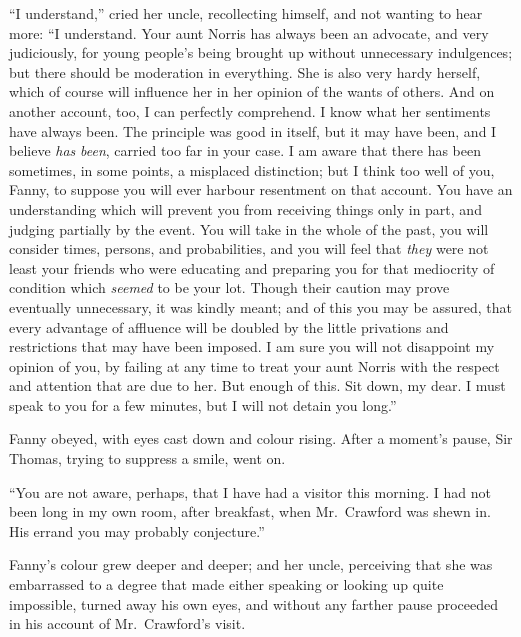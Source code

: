\documentclass{article}
\begin{document}
``I understand,'' cried her uncle, recollecting himself,
and not wanting to hear more:  ``I understand.  Your aunt
Norris has always been an advocate, and very judiciously,
for young people's being brought up without unnecessary
indulgences; but there should be moderation in everything.
She is also very hardy herself, which of course will
influence her in her opinion of the wants of others.
And on another account, too, I can perfectly comprehend.
I know what her sentiments have always been.
The principle was good in itself, but it may have been,
and I believe \emph{has} \emph{been}, carried too far in your case.
I am aware that there has been sometimes, in some points,
a misplaced distinction; but I think too well of you, Fanny,
to suppose you will ever harbour resentment on that account.
You have an understanding which will prevent you from
receiving things only in part, and judging partially
by the event.  You will take in the whole of the past,
you will consider times, persons, and probabilities,
and you will feel that \emph{they} were not least your
friends who were educating and preparing you for that
mediocrity of condition which \emph{seemed} to be your lot.
Though their caution may prove eventually unnecessary,
it was kindly meant; and of this you may be assured,
that every advantage of affluence will be doubled by the little
privations and restrictions that may have been imposed.
I am sure you will not disappoint my opinion of you,
by failing at any time to treat your aunt Norris
with the respect and attention that are due to her.
But enough of this.  Sit down, my dear.  I must speak
to you for a few minutes, but I will not detain
you long.''

Fanny obeyed, with eyes cast down and colour rising.
After a moment's pause, Sir Thomas, trying to suppress
a smile, went on.

``You are not aware, perhaps, that I have had a visitor
this morning.  I had not been long in my own room,
after breakfast, when Mr.\ Crawford was shewn in.
His errand you may probably conjecture.''

Fanny's colour grew deeper and deeper; and her uncle,
perceiving that she was embarrassed to a degree that
made either speaking or looking up quite impossible,
turned away his own eyes, and without any farther pause
proceeded in his account of Mr.\ Crawford's visit.
\end{document}
